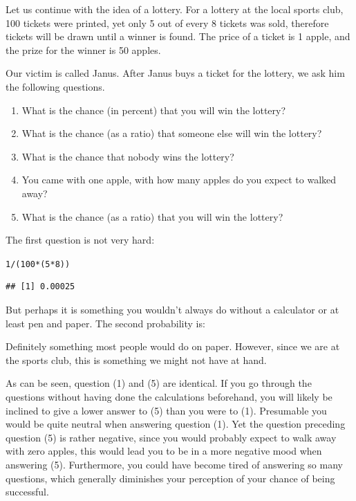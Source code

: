 \documentclass[a4paper]{book}\usepackage{graphicx, color}
\makeatletter
\newenvironment{kframe}{%
 \def\at@end@of@kframe{}%
 \ifinner\ifhmode%
  \def\at@end@of@kframe{\end{minipage}}%
  \begin{minipage}{\columnwidth}%
 \fi\fi%
 \def\FrameCommand##1{\hskip\@totalleftmargin \hskip-\fboxsep
 \colorbox{shadecolor}{##1}\hskip-\fboxsep
     \hskip-\linewidth \hskip-\@totalleftmargin \hskip\columnwidth}%
 \MakeFramed {\advance\hsize-\width
   \@totalleftmargin\z@ \linewidth\hsize
   \@setminipage}}%
 {\par\unskip\endMakeFramed%
 \at@end@of@kframe}
\newenvironment{knitrout}{}{} %
\makeatother
\begin{document}
Let us continue with the idea of a lottery. For a lottery at the local
sports club, 100 tickets were printed, yet only 5 out of every 8 tickets
was sold, therefore tickets will be drawn until a winner is found. The
price of a ticket is 1 apple, and the prize for the winner is 50 apples.

Our victim is called Janus. After Janus buys a ticket for the lottery,
we ask him the following questions.

\begin{enumerate}
\def\labelenumi{\arabic{enumi}.}
\itemsep1pt\parskip0pt
\item
  What is the chance (in percent) that you will win the lottery?
\item
  What is the chance (as a ratio) that someone else will win the
  lottery?
\item
  What is the chance that nobody wins the lottery?
\item
  You came with one apple, with how many apples do you expect to walked
  away?
\item
  What is the chance (as a ratio) that you will win the lottery?
\end{enumerate}

The first question is not very hard:

\begin{knitrout}
\color{fgcolor}\begin{kframe}
\begin{alltt}
1/(100 * (5 * 8))
\end{alltt}
\begin{verbatim}
## [1] 0.00025
\end{verbatim}
\end{kframe}
\end{knitrout}


But perhaps it is something you wouldn't always do without a calculator
or at least pen and paper. The second probability is:

Definitely something most people would do on paper. However, since we
are at the sports club, this is something we might not have at hand.

As can be seen, question (1) and (5) are identical. If you go through
the questions without having done the calculations beforehand, you will
likely be inclined to give a lower answer to (5) than you were to (1).
Presumable you would be quite neutral when answering question (1). Yet
the question preceding question (5) is rather negative, since you would
probably expect to walk away with zero apples, this would lead you to be
in a more negative mood when answering (5). Furthermore, you could have
become tired of answering so many questions, which generally diminishes
your perception of your chance of being successful.
\end{document}
